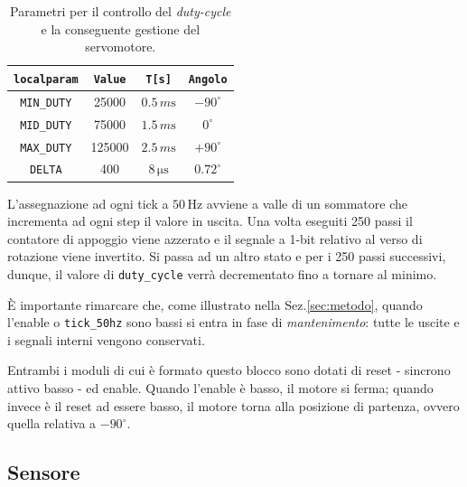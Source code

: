 \documentclass[reprint,amsmath,amssymb,aps,rmp,twoside]{revtex4-2}
\begin{document}
\begin{table}[t!]
\begin{ruledtabular}
    \begin{tabular}{cccc}
         \texttt{localparam}&\texttt{Value}&\texttt{T[s]}&\texttt{Angolo}\\
         \hline
         \texttt{MIN\_DUTY}& 25000& $0.5\,\si{m\s}$& $-90^\circ$\\
         \texttt{MID\_DUTY}& 75000& $1.5\,\si{m\s}$& $0^\circ$\\
         \texttt{MAX\_DUTY}& 125000& $2.5\,\si{m\s}$& $+90^\circ$\\
         \hline
         \texttt{DELTA}& 400& $8\,\si{\micro\s}$& $0.72^\circ$\\
    \end{tabular}
    \caption{Parametri per il controllo del \textit{duty-cycle} e la conseguente gestione del servomotore.}
    \label{tab:servo}
\end{ruledtabular}
\end{table}

L'assegnazione ad ogni tick a $50\,\si{\hertz}$ avviene a valle di un sommatore che incrementa ad ogni step il valore in uscita. Una volta eseguiti 250 passi il contatore di appoggio viene azzerato e il segnale a 1-bit relativo al verso di rotazione viene invertito. Si passa ad un altro stato e per i 250 passi successivi, dunque, il valore di \texttt{duty\_cycle} verrà decrementato fino a tornare al minimo.

\vspace{0.3cm}

È importante rimarcare che, come illustrato nella Sez.\ref{sec:metodo}, quando l'enable o \texttt{tick\_50hz} sono bassi si entra in fase di \textit{mantenimento}: tutte le uscite e i segnali interni vengono conservati.


Entrambi i moduli di cui è formato questo blocco sono dotati di reset - sincrono attivo basso - ed enable. Quando l'enable è basso, il motore si ferma; quando invece è il reset ad essere basso, il motore torna alla posizione di partenza, ovvero quella relativa a $-90^\circ$.





\subsection{Sensore}
\end{document}
